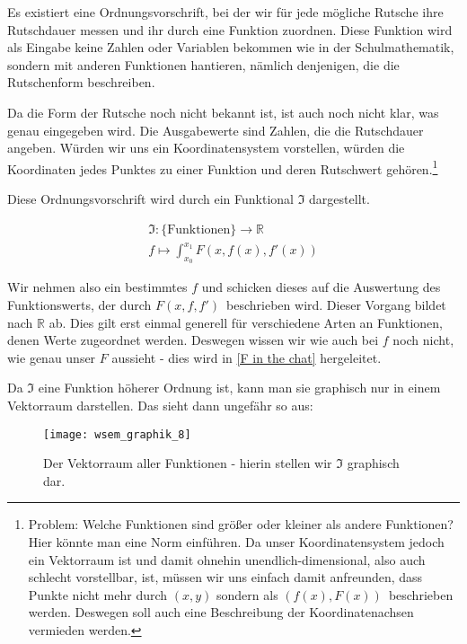 Es existiert eine Ordnungsvorschrift, bei der wir für jede mögliche Rutsche ihre Rutschdauer messen und ihr durch eine Funktion zuordnen. 
Diese Funktion wird als Eingabe keine Zahlen oder Variablen bekommen wie in der Schulmathematik, sondern mit anderen Funktionen hantieren, nämlich denjenigen, die die Rutschenform beschreiben. 

Da die Form der Rutsche noch nicht bekannt ist, ist auch noch nicht klar, was genau eingegeben wird. 
Die Ausgabewerte sind Zahlen, die die Rutschdauer angeben.
Würden wir uns ein Koordinatensystem vorstellen, würden die Koordinaten jedes Punktes zu einer Funktion und deren Rutschwert gehören.\footnote{Problem: Welche Funktionen sind größer oder kleiner als andere Funktionen? Hier könnte man eine Norm einführen. Da unser Koordinatensystem jedoch ein Vektorraum ist und damit ohnehin unendlich-dimensional, also auch schlecht vorstellbar, ist, müssen wir uns einfach damit anfreunden, dass Punkte nicht mehr durch $(x,y)$ sondern als $(f(x), F(x)) \,$ beschrieben werden. Deswegen soll auch eine Beschreibung der Koordinatenachsen vermieden werden.}


Diese Ordnungsvorschrift wird durch ein Funktional $\mathfrak{I}$ dargestellt.

\begin{equation}
 \begin{gathered}
   \mathfrak{I}\colon
   { \{\text{Funktionen}\}} \rightarrow {\mathbb{R}} \\ 
    f \mapsto \int_{x_0}^{x_1} F(x, f(x), f'(x))
 \end{gathered}
\end{equation}


Wir nehmen also ein bestimmtes $f$ und schicken dieses auf die Auswertung des Funktionswerts, der durch $F(x,f, f')\,$ beschrieben wird. Dieser Vorgang bildet nach $\mathbb{R}$ ab. 
Dies gilt erst einmal generell für verschiedene Arten an Funktionen, denen Werte zugeordnet werden. 
Deswegen wissen wir wie auch bei $f$ noch nicht, wie genau unser $F$ aussieht - dies wird in \ref{F in the chat} hergeleitet.

Da $\mathfrak{I}$ eine Funktion höherer Ordnung ist, kann man sie graphisch nur in einem Vektorraum darstellen. 
Das sieht dann ungefähr so aus:
\begin{figure}[ht]
 \centering
 \texttt{[image: wsem\_graphik\_8]}
 \caption[Leerer Vektorraum. TikZ - eigene Arbeit.]{Der Vektorraum aller Funktionen - hierin stellen wir $\mathfrak{I}$ graphisch dar.}
 \label{fig:vektfunc}
\end{figure}

